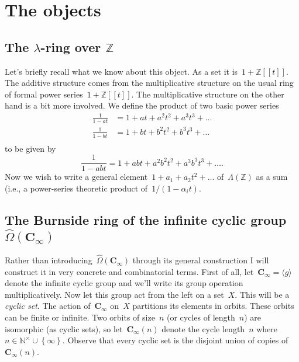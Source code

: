 \section{The objects}

\subsection{The $\lambda$-ring over $\mathbb{Z}$}
Let's briefly recall what we know about this object. As a set it is~$1+\mathbb{Z}[\![t]\!]$. The additive structure comes from the multiplicative structure on the usual ring of formal power series~$1+\mathbb{Z}[\![t]\!]$. The multiplicative structure on the other hand is a bit more involved. We define the product of two basic power series
\begin{equation}
  \begin{aligned}
    \frac{1}{1-at}&=1+at+a^2t^2+a^3t^3+\ldots \\
    \frac{1}{1-bt}&=1+bt+b^2t^2+b^3t^3+\ldots \\
  \end{aligned}
\end{equation}
to be given by
\begin{equation}
  \frac{1}{1-abt}=1+abt+a^2b^2t^2+a^3b^3t^3+\ldots.
\end{equation}
Now we wish to write a general element~$1+a_1+a_2t^2+\ldots$ of~$\Lambda(\mathbb{Z})$ as a sum (i.e., a power-series theoretic product of~$1/(1-\alpha_it)$.



\subsection{The Burnside ring of the infinite cyclic group $\hat{\Omega}(\mathbf{C}_\infty)$}
Rather than introducing~$\hat{\Omega}(\mathbf{C}_\infty)$ through its general construction I will construct it in very concrete and combinatorial terms. First of all, let~$\mathbf{C}_\infty=\langle g\rangle$ denote the infinite cyclic group and we'll write its group operation multiplicatively. Now let this group act from the left on a set~$X$. This will be a \emph{cyclic set}. The action of~$\mathbf{C}_\infty$ on~$X$ partitions its elements in orbits. These orbits can be finite or infinite. Two orbits of size~$n$ (or cycles of length~$n$) are isomorphic (as cyclic sets), so let~$\mathbf{C}_\infty(n)$ denote the cycle length~$n$ where~$n\in\mathbb{N}^\times\cup\left\{ \infty \right\}$. Observe that every cyclic set is the disjoint union of copies of~$\mathbf{C}_\infty(n)$.

